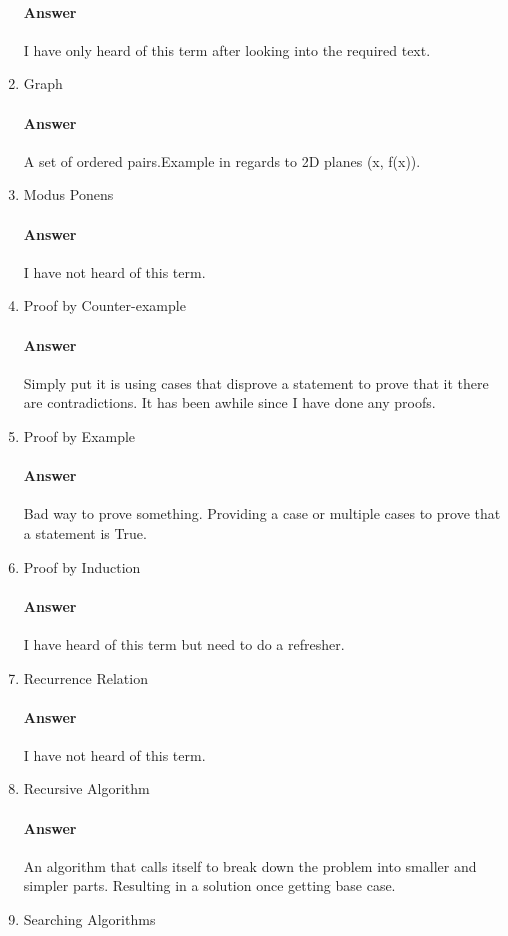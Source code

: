 \documentclass{article}
\begin{document}
\begin{enumerate}
        \paragraph{Answer}
        I have only heard of this term after looking into the required text.
    \item Graph
        \paragraph{Answer}
        A set of ordered pairs.Example in regards to 2D planes (x, f(x)). 
    \item Modus Ponens
        \paragraph{Answer}
        I have not heard of this term.
    \item Proof by Counter-example
        \paragraph{Answer}
        Simply put it is using cases that disprove a statement to prove that it there are contradictions. It has been awhile since I have done any proofs.
    \item Proof by Example
        \paragraph{Answer}
        Bad way to prove something. Providing a case or multiple cases to prove that a statement is True.
    \item Proof by Induction
        \paragraph{Answer}
	I have heard of this term but need to do a refresher.        
    \item Recurrence Relation
        \paragraph{Answer}
        I have not heard of this term.
    \item Recursive Algorithm
        \paragraph{Answer}
        An algorithm that calls itself to break down the problem into smaller and simpler parts. Resulting in a solution once getting base case.
    \item Searching Algorithms

\end{enumerate}
\end{document}
